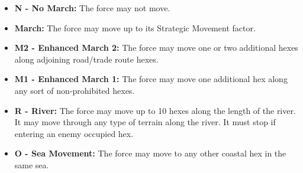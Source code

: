 {\def\arraystretch{1.1}
  }

\begin{minipage}{\textwidth}
\begin{itemize}
  \item \textbf{N - No March:} The force may not move.
  \item \textbf{March:} The force may move up to its Strategic Movement factor.
  \item \textbf{M2 - Enhanced March 2:} The force may move one or two additional hexes along adjoining road/trade route hexes.
  \item \textbf{M1 - Enhanced March 1:} The force may move one additional hex along any sort of non-prohibited hexes.
  \item \textbf{R - River:} The force may move up to 10 hexes along the length of the river. It may move through any type of terrain along the river. It must stop if entering an enemy occupied hex.
  \item \textbf{O - Sea Movement:} The force may move to any other coastal hex in the same sea.
\end{itemize}
\end{minipage}
